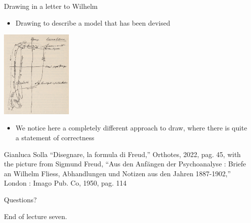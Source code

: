 \documentclass{beamer}
\begin{document}
\begin{frame}
{\centerline{Drawing in a letter to Wilhelm}}

\begin{itemize}
   \item Drawing to describe a model that has been devised
 \end{itemize} 


\begin{center}
 \includegraphics[width=3.5cm]{P2023.AIBCCSS.Drawing/schematizzazione.jpg}
 
 \end{center}

\begin{itemize}
   \item We notice here a completely different approach to draw, where there is quite a statement of correctness
 \end{itemize} 

\begin{center}
\tiny
Gianluca Solla ``Disegnare, la formula di Freud,'' Orthotes, 2022, pag. 45, with the picture from Sigmund Freud, ``Aus den Anf\"{a}ngen der Psychoanalyse : Briefe an Wilhelm Fliess, Abhandlungen und Notizen aus den Jahren 1887-1902,'' London : Imago Pub. Co, 1950, pag. 114
\end{center}
\end{frame}



\begin{frame}
{\centerline{Questions?}}
\vspace{1cm}
\begin{center}
    \LARGE{End of lecture seven.}
\end{center}

\end{frame}
\end{document}
